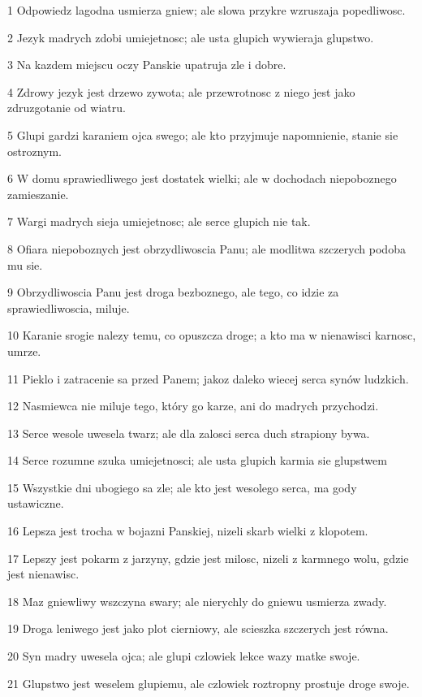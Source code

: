 \par 1 Odpowiedz lagodna usmierza gniew; ale slowa przykre wzruszaja popedliwosc.
\par 2 Jezyk madrych zdobi umiejetnosc; ale usta glupich wywieraja glupstwo.
\par 3 Na kazdem miejscu oczy Panskie upatruja zle i dobre.
\par 4 Zdrowy jezyk jest drzewo zywota; ale przewrotnosc z niego jest jako zdruzgotanie od wiatru.
\par 5 Glupi gardzi karaniem ojca swego; ale kto przyjmuje napomnienie, stanie sie ostroznym.
\par 6 W domu sprawiedliwego jest dostatek wielki; ale w dochodach niepoboznego zamieszanie.
\par 7 Wargi madrych sieja umiejetnosc; ale serce glupich nie tak.
\par 8 Ofiara niepoboznych jest obrzydliwoscia Panu; ale modlitwa szczerych podoba mu sie.
\par 9 Obrzydliwoscia Panu jest droga bezboznego, ale tego, co idzie za sprawiedliwoscia, miluje.
\par 10 Karanie srogie nalezy temu, co opuszcza droge; a kto ma w nienawisci karnosc, umrze.
\par 11 Pieklo i zatracenie sa przed Panem; jakoz daleko wiecej serca synów ludzkich.
\par 12 Nasmiewca nie miluje tego, który go karze, ani do madrych przychodzi.
\par 13 Serce wesole uwesela twarz; ale dla zalosci serca duch strapiony bywa.
\par 14 Serce rozumne szuka umiejetnosci; ale usta glupich karmia sie glupstwem
\par 15 Wszystkie dni ubogiego sa zle; ale kto jest wesolego serca, ma gody ustawiczne.
\par 16 Lepsza jest trocha w bojazni Panskiej, nizeli skarb wielki z klopotem.
\par 17 Lepszy jest pokarm z jarzyny, gdzie jest milosc, nizeli z karmnego wolu, gdzie jest nienawisc.
\par 18 Maz gniewliwy wszczyna swary; ale nierychly do gniewu usmierza zwady.
\par 19 Droga leniwego jest jako plot cierniowy, ale scieszka szczerych jest równa.
\par 20 Syn madry uwesela ojca; ale glupi czlowiek lekce wazy matke swoje.
\par 21 Glupstwo jest weselem glupiemu, ale czlowiek roztropny prostuje droge swoje.
